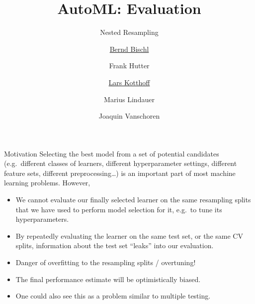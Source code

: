 




\title[AutoML: Risks]{AutoML: Evaluation} %
\subtitle{Nested Resampling} %
\author[Lars Kotthoff]{\underline{Bernd Bischl} \and Frank Hutter \and \underline{Lars Kotthoff}\newline \and Marius Lindauer \and Joaquin Vanschoren}
\institute{}
\date{}

\newcommand\reffootnote[1]{%
    \begingroup
    \renewcommand\thefootnote{}\footnote{
        \tiny #1
    \vspace*{1em}}%
    \addtocounter{footnote}{-1}%
    \endgroup
}



	
	\maketitle

    \begin{frame}[c]{Motivation}
    Selecting the best model from a set of potential candidates (e.g.\ different
    classes of learners, different hyperparameter settings, different feature
    sets, different preprocessing\ldots) is an important part of most  machine
    learning problems. However,

    \begin{itemize}
        \item We cannot evaluate our finally selected learner on the same
            resampling splits that we have used to perform model selection for
            it, e.g.\ to tune its hyperparameters.
        \item By repeatedly evaluating the learner on the same test set, or the same CV splits, information
          about the test set ``leaks'' into our evaluation.
        \item Danger of overfitting to the resampling splits / overtuning!
        \item The final performance estimate will be optimistically biased.
        \item One could also see this as a problem similar to multiple testing.
    \end{itemize}
    \end{frame}

